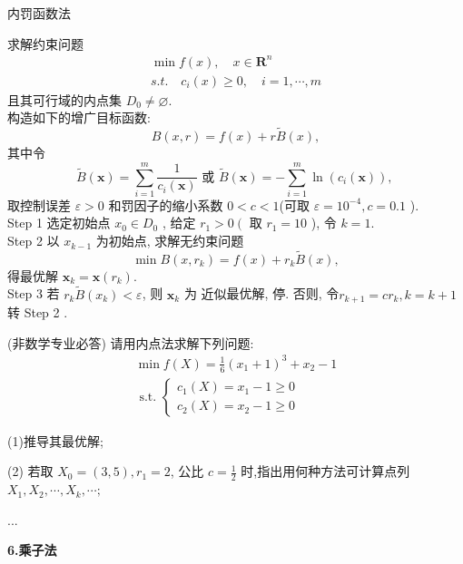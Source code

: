 \documentclass[cn]{elegantbook}
\begin{document}
\begin{algorithm}
\begin{center}
  \Large 内罚函数法
\end{center}
求解约束问题
$$\begin{array}{c}
    \min f(x), \quad x \in \mathbf{R}^{n}
 \\
    s.t.  \quad c_{i}(x) \geqslant 0, \quad i=1, \cdots, m
  \end{array} $$
 且其可行域的内点集 $ D_{0} \neq \varnothing .$\\
构造如下的增广目标函数:
$$
B(x, r)=f(x)+r \tilde{B}(x),
$$
其中令
$$
\tilde{B}(\boldsymbol{x})=\sum_{i=1}^{m} \frac{1}{c_{i}(\boldsymbol{x})} \text { 或 } \tilde{B}(\boldsymbol{x})=-\sum_{i=1}^{m} \ln \left(c_{i}(\boldsymbol{x})\right) \text {, }
$$
取控制误差  $\varepsilon>0 $ 和罚因子的缩小系数 $ 0<c<1  $(可取  $\varepsilon=10^{-4}, c=0.1$  ).\\
Step 1 选定初始点 $ x_{0} \in D_{0}$ , 给定  $r_{1}>0\left(\right. $ 取  $r_{1}=10 $ ), 令 $ k=1 $.\\
Step 2 以  $x_{k-1}$  为初始点, 求解无约束问题
$$
\min B\left(x, r_{k}\right)=f(x)+r_{k} \tilde{B}(x),
$$
 得最优解  $\boldsymbol{x}_{k}=\boldsymbol{x}\left(r_{k}\right) $.\\
Step 3 若 $ r_{k} \tilde{B}\left(x_{k}\right)<\varepsilon $, 则 $ \boldsymbol{x}_{k} $ 为 近似最优解, 停. 否则, 令$  r_{k+1}=c r_{k}, k=k+1$  转 Step  2 .
\end{algorithm}


\begin{exercisez}
(非数学专业必答) 请用内点法求解下列问题:
$$
\begin{array}{l}
\min f(X)=\frac{1}{6}\left(x_{1}+1\right)^{3}+x_{2}-1 \\
\text { s.t. }\left\{\begin{array}{l}
c_{1}(X)=x_{1}-1 \geq 0 \\
c_{2}(X)=x_{2}-1 \geq 0
\end{array}\right.
\end{array}
$$

(1)推导其最优解;

(2) 若取  $X_{0}=(3,5), r_{1}=2 $, 公比 $ c=\frac{1}{2}$  时,指出用何种方法可计算点列  $X_{1}, X_{2}, \cdots, X_{k}, \cdots ;$
\end{exercisez}
\begin{solution}
...
\end{solution}




\newpage
\begin{center}
 \textcolor[rgb]{0.33,0.33,1.00}{\huge \bf{6.乘子法}}
\end{center}
\end{document}
